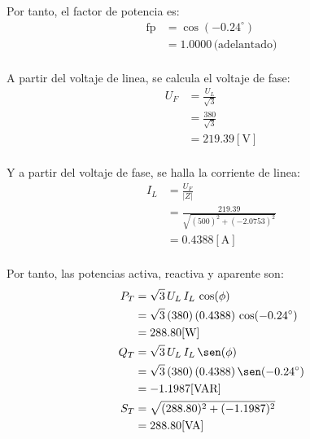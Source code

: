 \documentclass[letter,11pt]{article}
\begin{document}
Por tanto, el factor de potencia es:
\begin{equation*}
    \begin{split}
        \text{fp} &= \cos(-0.24^{\circ})\\
                  &= 1.0000\,\text{(adelantado)}\\
    \end{split}
\end{equation*}

A partir del voltaje de linea, se calcula el voltaje de fase:
\begin{equation*}
    \begin{split}
        U_F &= \frac{U_L}{\sqrt{3}}\\
            &= \frac{380}{\sqrt{3}}\\
            &= 219.39[\text{V}]\\
    \end{split}
\end{equation*}

Y a partir del voltaje de fase, se halla la corriente de linea:
\begin{equation*}
    \begin{split}
        I_L &= \frac{U_F}{|Z|}\\
            &= \frac{219.39}{\sqrt{(500)^2+(-2.0753)^2}}\\
            &= 0.4388[\text{A}]\\
    \end{split}
\end{equation*}

Por tanto, las potencias activa, reactiva y aparente son:
\begin{equation*}
    \begin{split}
        P_T &= \sqrt{3}\,U_L\,I_L\,\cos(\phi)\\
            &= \sqrt{3}\,(380)\,(0.4388)\,\cos(-0.24^{\circ})\\
            &= 288.80[\text{W}]\\
        Q_T &= \sqrt{3}\,U_L\,I_L\,\sen(\phi)\\
            &= \sqrt{3}\,(380)\,(0.4388)\,\sen(-0.24^{\circ})\\
            &= -1.1987[\text{VAR}]\\
        S_T &= \sqrt{(288.80)^2+(-1.1987)^2}\\
            &= 288.80[\text{VA}]\\
    \end{split}
\end{equation*}
\end{document}

